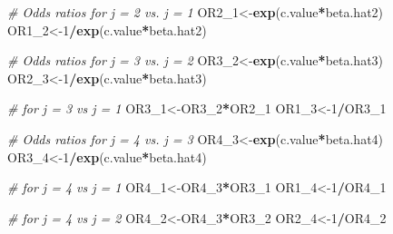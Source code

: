 \documentclass[11pt,]{article}
\newenvironment{Shaded}{\begin{snugshade}}{\end{snugshade}}
\newcommand{\KeywordTok}[1]{\textcolor[rgb]{0.13,0.29,0.53}{\textbf{#1}}}
\newcommand{\DecValTok}[1]{\textcolor[rgb]{0.00,0.00,0.81}{#1}}
\newcommand{\CommentTok}[1]{\textcolor[rgb]{0.56,0.35,0.01}{\textit{#1}}}
\newcommand{\OperatorTok}[1]{\textcolor[rgb]{0.81,0.36,0.00}{\textbf{#1}}}
\newcommand{\NormalTok}[1]{#1}
\begin{document}
\begin{Shaded}
\begin{Highlighting}[]
\CommentTok{# Odds ratios for j = 2 vs. j = 1 }
\NormalTok{OR2_}\DecValTok{1}\NormalTok{<-}\KeywordTok{exp}\NormalTok{(c.value}\OperatorTok{*}\NormalTok{beta.hat2)}
\NormalTok{OR1_}\DecValTok{2}\NormalTok{<-}\DecValTok{1}\OperatorTok{/}\KeywordTok{exp}\NormalTok{(c.value}\OperatorTok{*}\NormalTok{beta.hat2)}

\CommentTok{# Odds ratios for j = 3 vs. j = 2 }
\NormalTok{OR3_}\DecValTok{2}\NormalTok{<-}\KeywordTok{exp}\NormalTok{(c.value}\OperatorTok{*}\NormalTok{beta.hat3)}
\NormalTok{OR2_}\DecValTok{3}\NormalTok{<-}\DecValTok{1}\OperatorTok{/}\KeywordTok{exp}\NormalTok{(c.value}\OperatorTok{*}\NormalTok{beta.hat3)}

\CommentTok{# for j = 3 vs j = 1}
\NormalTok{OR3_}\DecValTok{1}\NormalTok{<-OR3_}\DecValTok{2}\OperatorTok{*}\NormalTok{OR2_}\DecValTok{1}
\NormalTok{OR1_}\DecValTok{3}\NormalTok{<-}\DecValTok{1}\OperatorTok{/}\NormalTok{OR3_}\DecValTok{1}

\CommentTok{# Odds ratios for j = 4 vs. j = 3 }
\NormalTok{OR4_}\DecValTok{3}\NormalTok{<-}\KeywordTok{exp}\NormalTok{(c.value}\OperatorTok{*}\NormalTok{beta.hat4)}
\NormalTok{OR3_}\DecValTok{4}\NormalTok{<-}\DecValTok{1}\OperatorTok{/}\KeywordTok{exp}\NormalTok{(c.value}\OperatorTok{*}\NormalTok{beta.hat4)}

\CommentTok{# for j = 4 vs j = 1}
\NormalTok{OR4_}\DecValTok{1}\NormalTok{<-OR4_}\DecValTok{3}\OperatorTok{*}\NormalTok{OR3_}\DecValTok{1}
\NormalTok{OR1_}\DecValTok{4}\NormalTok{<-}\DecValTok{1}\OperatorTok{/}\NormalTok{OR4_}\DecValTok{1} 

\CommentTok{# for j = 4 vs j = 2}
\NormalTok{OR4_}\DecValTok{2}\NormalTok{<-OR4_}\DecValTok{3}\OperatorTok{*}\NormalTok{OR3_}\DecValTok{2}
\NormalTok{OR2_}\DecValTok{4}\NormalTok{<-}\DecValTok{1}\OperatorTok{/}\NormalTok{OR4_}\DecValTok{2}
\end{Highlighting}
\end{Shaded}
\end{document}
